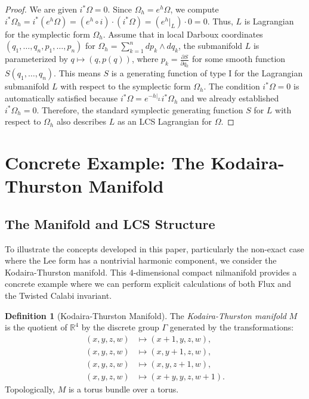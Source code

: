 \documentclass[11pt,a4paper]{amsart}
\theoremstyle{definition}
\newtheorem{definition}[theorem]{Definition}
\theoremstyle{remark}
\begin{document}
	\begin{proof}
		We are given $i^*\Omega = 0$. Since $\Omega_h = e^h\Omega$, we compute $i^*\Omega_h = i^*(e^h\Omega) = (e^h \circ i) \cdot (i^*\Omega) = (e^h|_L) \cdot 0 = 0$. Thus, $L$ is Lagrangian for the symplectic form $\Omega_h$. Assume that in local Darboux coordinates $(q_1, \dots, q_n, p_1, \dots, p_n)$ for $\Omega_h = \sum_{k=1}^n dp_k \wedge dq_k$, the submanifold $L$ is parameterized by $q \mapsto (q, p(q))$, where $p_k = \frac{\partial S}{\partial q_k}$ for some smooth function $S(q_1, \dots, q_n)$. This means $S$ is a generating function of type I for the Lagrangian submanifold $L$ with respect to the symplectic form $\Omega_h$. The condition $i^*\Omega = 0$ is automatically satisfied because $i^*\Omega = e^{-h|_L} i^*\Omega_h$ and we already established $i^*\Omega_h = 0$. Therefore, the standard symplectic generating function $S$ for $L$ with respect to $\Omega_h$ also describes $L$ as an LCS Lagrangian for $\Omega$.
	\end{proof}
	
	\section{Concrete Example: The Kodaira-Thurston Manifold}
	
	\subsection{The Manifold and LCS Structure}
	
	To illustrate the concepts developed in this paper, particularly the non-exact case where the Lee form has a nontrivial harmonic component, we consider the Kodaira-Thurston manifold. This 4-dimensional compact nilmanifold provides a concrete example where we can perform explicit calculations of both Flux and the Twisted Calabi invariant.
	
	\begin{definition}[Kodaira-Thurston Manifold]
		The \emph{Kodaira-Thurston manifold} $M$ is the quotient of $\mathbb{R}^4$ by the discrete group $\Gamma$ generated by the transformations:
		\begin{align*}
			(x, y, z, w) &\mapsto (x+1, y, z, w), \\
			(x, y, z, w) &\mapsto (x, y+1, z, w), \\
			(x, y, z, w) &\mapsto (x, y, z+1, w), \\
			(x, y, z, w) &\mapsto (x+y, y, z, w+1).
		\end{align*}
		Topologically, $M$ is a torus bundle over a torus.
	\end{definition}
	
\end{document}
